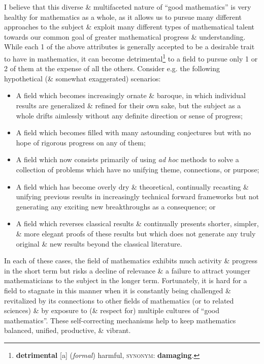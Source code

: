 \documentclass[oneside]{book}
\numberwithin{equation}{section}
\begin{document}
I believe that this diverse \& multifaceted nature of ``good mathematics'' is very healthy for mathematics as a whole, as it allows us to pursue many different approaches to the subject \& exploit many different types of mathematical talent towards our common goal of greater mathematical progress \& understanding. While each 1 of the above attributes is generally accepted to be a desirable trait to have in mathematics, it can become detrimental\footnote{\textbf{detrimental} [a] (\textit{formal}) harmful, \textsc{synonym}: \textbf{damaging}.} to a field to pursue only 1 or 2 of them at the expense of all the others. Consider e.g. the following hypothetical (\& somewhat exaggerated) scenarios:
\begin{itemize}
	\item A field which becomes increasingly ornate \& baroque, in which individual results are generalized \& refined for their own sake, but the subject as a whole drifts aimlessly without any definite direction or sense of progress;
	\item A field which becomes filled with many astounding conjectures but with no hope of rigorous progress on any of them;
	\item A field which now consists primarily of using \textit{ad hoc} methods to solve a collection of problems which have no unifying theme, connections, or purpose;
	\item A field which has become overly dry \& theoretical, continually recasting \& unifying previous results in increasingly technical forward frameworks but not generating any exciting new breakthroughs as a consequence; or
	\item A field which reverses classical results \& continually presents shorter, simpler, \& more elegant proofs of these results but which does not generate any truly original \& new results beyond the classical literature.
\end{itemize}
In each of these cases, the field of mathematics exhibits much activity \& progress in the short term but risks a decline of relevance \& a failure to attract younger mathematicians to the subject in the longer term. Fortunately, it is hard for a field to stagnate in this manner when it is constantly being challenged \& revitalized by its connections to other fields of mathematics (or to related sciences) \& by exposure to (\& respect for) multiple cultures of ``good mathematics''. These self-correcting mechanisms help to keep mathematics balanced, unified, productive, \& vibrant.
\end{document}
